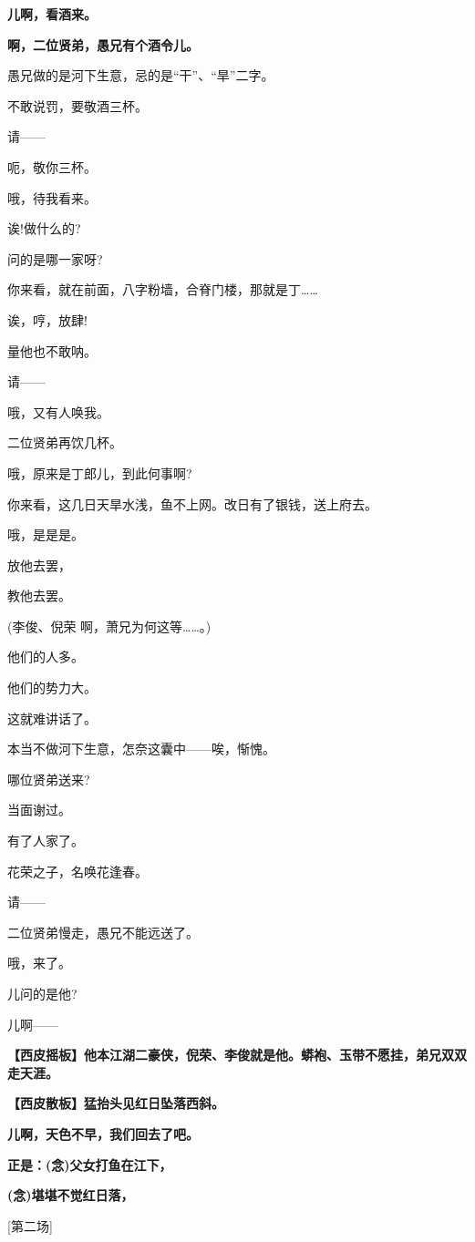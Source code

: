 \textbf{儿啊，看酒来。}

\textbf{啊，二位贤弟，愚兄有个酒令儿。}

愚兄做的是河下生意，忌的是``干''、``旱''二字。

不敢说罚，要敬酒三杯。

请------

呃，敬你三杯。

哦，待我看来。

诶!做什么的?

问的是哪一家呀?

你来看，就在前面，八字粉墙，合脊门楼，那就是丁\ldots{}\ldots{}

诶，哼，放肆!

量他也不敢呐。

请------

哦，又有人唤我。

二位贤弟再饮几杯。

哦，原来是丁郎儿，到此何事啊?

你来看，这几日天旱水浅，鱼不上网。改日有了银钱，送上府去。

哦，是是是。

放他去罢，

教他去罢。

(李俊、倪荣 啊，萧兄为何这等\ldots{}\ldots{}。)

他们的人多。

他们的势力大。

这就难讲话了。

本当不做河下生意，怎奈这囊中------唉，惭愧。

哪位贤弟送来?

当面谢过。

有了人家了。

花荣之子，名唤花逢春。

请------

二位贤弟慢走，愚兄不能远送了。

哦，来了。

儿问的是他?

儿啊------

\textbf{【西皮摇板】他本江湖二豪侠，倪荣、李俊就是他。蟒袍、玉带不愿挂，弟兄双双走天涯。}

\textbf{【西皮散板】猛抬头见红日坠落西斜。}

\textbf{儿啊，天色不早，我们回去了吧。}

\textbf{正是：(念)父女打鱼在江下，}

\textbf{(念)堪堪不觉红日落，}

{[}第二场{]}

